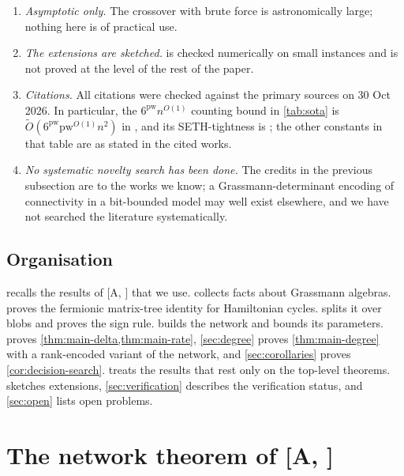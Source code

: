 \documentclass[11pt]{amsart}
\theoremstyle{plain}
\theoremstyle{definition}
\theoremstyle{remark}
\numberwithin{equation}{section}
\newcommand{\A}[1][]{\textup{[A\if\relax\detokenize{#1}\relax\else, #1\fi]}}
\begin{document}
\begin{enumerate}[label=\textup{(\alph*)}]
single-exponential-in-treewidth algorithms, and on planar graphs the $2^{O(\sqrt n)}$ bound is
better than ours. The gain is on sparse graphs with no such structure, for example bounded-degree
expanders.
\item \emph{Asymptotic only.} The crossover with brute force is astronomically large; nothing
here is of practical use.
\item \emph{The extensions are sketched.}  is checked numerically on
small instances and is not proved at the level of the rest of the paper.
\item \emph{Citations.} All citations were checked against the primary sources on 30 Oct 2026.
In particular, the $6^{\mathrm{pw}}n^{O(1)}$ counting bound in \cref{tab:sota} is
$\tilde O(6^{\mathrm{pw}}\mathrm{pw}^{O(1)}n^2)$ in \cite[Table~1]{BCKN15}, and its SETH-tightness
is \cite[Thm.~1.1]{CLN18}; the other constants in that table are as stated in the cited works.
\item \emph{No systematic novelty search has been done.} The credits in the previous subsection
are to the works we know; a Grassmann-determinant encoding of connectivity in a bit-bounded model
may well exist elsewhere, and we have not searched the literature systematically.
\end{enumerate}

\subsection{Organisation}
 recalls the results of \A{} that we use.  collects facts
about Grassmann algebras.  proves the fermionic matrix-tree identity for
Hamiltonian cycles.  splits it over blobs and proves the sign rule.
 builds the network and bounds its parameters.  proves
\cref{thm:main-delta,thm:main-rate}, \cref{sec:degree} proves \cref{thm:main-degree} with a
rank-encoded variant of the network, and \cref{sec:corollaries} proves
\cref{cor:decision-search}.  treats the results that rest only on the top-level
theorems.  sketches extensions, \cref{sec:verification} describes the
verification status, and \cref{sec:open} lists open problems.

\section{The network theorem of \texorpdfstring{\A}{[A]}}\label{sec:imported}
\end{document}
